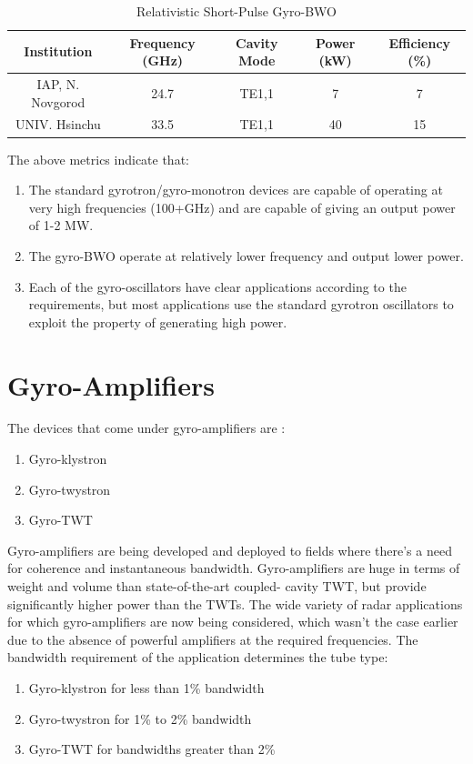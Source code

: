\begin{table}[H]
	\begin{tabular}{c|c|c|c|c}	
	Institution & Frequency (GHz) & Cavity Mode & Power (kW) & Efficiency (\%) \\
	\hline
	IAP, N. Novgorod & 24.7 & TE1,1 & 7 & 7\\
	UNIV. Hsinchu & 33.5 & TE1,1 & 40 & 15
	\end{tabular}
	\caption{Relativistic Short-Pulse Gyro-BWO\cite{ref:soa} }
	\label{tab:spgb}
\end{table}

The above metrics\cite{ref:soa} indicate that:
\begin{enumerate}
\item The standard gyrotron/gyro-monotron devices are capable of operating at very high frequencies (100+GHz) and are capable of giving an output power of 1-2 MW.
\item The gyro-BWO operate at relatively lower frequency and output lower power.
\item

Each of the gyro-oscillators have clear applications according to the requirements, but most applications use the standard gyrotron oscillators to exploit the property of generating high power.
\end{enumerate}


\section{Gyro-Amplifiers}
The devices that come under gyro-amplifiers are :
\begin{enumerate}
\item  Gyro-klystron
\item  Gyro-twystron
\item Gyro-TWT
\end{enumerate}

Gyro-amplifiers are being developed and deployed to fields where there's a need for coherence and instantaneous bandwidth. Gyro-amplifiers are huge in terms of weight and volume than state-of-the-art coupled- cavity TWT, but provide significantly higher power than the TWTs. The wide variety of radar applications for which gyro-amplifiers are now being considered, which wasn't the case earlier due to the absence of powerful amplifiers at the required frequencies. The bandwidth requirement of the application determines the tube type:

\begin{enumerate}
\item Gyro-klystron for less than 1\% bandwidth
\item Gyro-twystron for 1\% to 2\% bandwidth
\item Gyro-TWT for bandwidths greater than 2\%
\end{enumerate}

